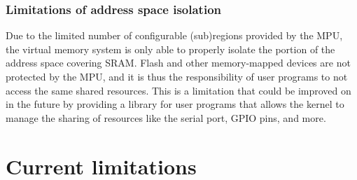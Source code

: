 \documentclass[12pt]{article}
\begin{document}
\subsubsection{Limitations of address space isolation}
Due to the limited number of configurable (sub)regions provided by the MPU, the
virtual memory system is only able to properly isolate the portion of the
address space covering SRAM. Flash and other memory-mapped devices are not
protected by the MPU, and it is thus the responsibility of user programs to not
access the same shared resources. This is a limitation that could be improved on
in the future by providing a library for user programs that allows the kernel
to manage the sharing of resources like the serial port, GPIO pins, and more.


\section{Current limitations}
\end{document}
